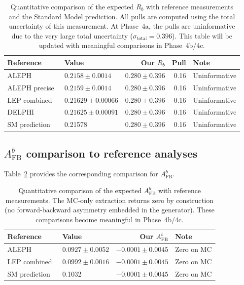 \documentclass[11pt,a4paper]{article}
\begin{document}
\begin{table}[htbp]
\centering
\caption{Quantitative comparison of the expected $R_b$ with reference measurements
and the Standard Model prediction. All pulls are computed using the total uncertainty
of this measurement. At Phase~4a, the pulls are uninformative due to the very large
total uncertainty ($\sigma_\mathrm{total} = 0.396$). This table will be updated with
meaningful comparisons in Phase~4b/4c.}
\label{tab:rb_comparison}
\begin{tabular}{llrrl}
\toprule
Reference & Value & Our $R_b$ & Pull & Note \\
\midrule
ALEPH~\cite{ALEPH:Rb:1996} & $0.2158 \pm 0.0014$ & $0.280 \pm 0.396$ & 0.16 & Uninformative \\
ALEPH precise~\cite{ALEPH:Rb:precise} & $0.2159 \pm 0.0014$ & $0.280 \pm 0.396$ & 0.16 & Uninformative \\
LEP combined~\cite{LEP:EWWG:2005} & $0.21629 \pm 0.00066$ & $0.280 \pm 0.396$ & 0.16 & Uninformative \\
DELPHI~\cite{DELPHI:Rb} & $0.21625 \pm 0.00091$ & $0.280 \pm 0.396$ & 0.16 & Uninformative \\
SM prediction~\cite{LEP:EWWG:2005} & 0.21578 & $0.280 \pm 0.396$ & 0.16 & Uninformative \\
\bottomrule
\end{tabular}
\end{table}

\subsection{$A_\mathrm{FB}^b$ comparison to reference analyses}
\label{sec:afb_comparison_detail}

Table~\ref{tab:afb_comparison} provides the corresponding comparison for $A_\mathrm{FB}^b$.

\begin{table}[htbp]
\centering
\caption{Quantitative comparison of the expected $A_\mathrm{FB}^b$ with reference
measurements. The MC-only extraction returns zero by construction (no forward-backward
asymmetry embedded in the generator). These comparisons become meaningful in Phase~4b/4c.}
\label{tab:afb_comparison}
\begin{tabular}{llrl}
\toprule
Reference & Value & Our $A_\mathrm{FB}^b$ & Note \\
\midrule
ALEPH~\cite{ALEPH:AFBb} & $0.0927 \pm 0.0052$ & $-0.0001 \pm 0.0045$ & Zero on MC \\
LEP combined~\cite{LEP:EWWG:2005} & $0.0992 \pm 0.0016$ & $-0.0001 \pm 0.0045$ & Zero on MC \\
SM prediction~\cite{LEP:EWWG:2005} & 0.1032 & $-0.0001 \pm 0.0045$ & Zero on MC \\
\bottomrule
\end{tabular}
\end{table}
\end{document}
